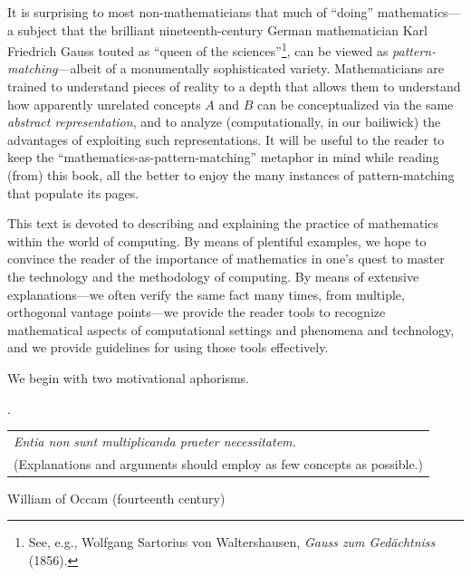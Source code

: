 It is surprising to most non-mathematicians that much of ``doing'' mathematics---a subject that the brilliant nineteenth-century German mathematician Karl Friedrich Gauss touted as ``queen of the sciences''\footnote{See, e.g., Wolfgang Sartorius von Waltershausen, {\it Gauss zum Ged\"{a}chtniss} (1856).}, can be viewed as {\em pattern-matching}---albeit of a monumentally sophisticated variety.  Mathematicians are trained to understand pieces of reality to a depth that allows them to understand how apparently unrelated concepts $A$ and $B$ can be conceptualized via the same {\em abstract representation}, and to analyze (computationally, in our bailiwick) the advantages of exploiting such representations.  It will be useful to the reader to keep the ``mathematics-as-pattern-matching'' metaphor in mind while reading (from) this book, all the better to enjoy the many instances of pattern-matching that populate its pages.

\medskip

This text is devoted to describing and explaining the practice of mathematics within the world of computing.  By means of plentiful examples, we hope to convince the reader of the importance of mathematics in one's quest to master the technology and the methodology of computing.  By means of extensive explanations---we often verify the same fact many times, from multiple,
orthogonal vantage points---we provide the reader tools to recognize mathematical aspects of computational settings and phenomena and technology, and we provide guidelines for using those tools effectively.

\medskip

We begin with two motivational aphorisms.

\medskip

.

\smallskip

\noindent \hspace*{.1in}
\begin{tabular}{l}
{\it Entia non sunt multiplicanda praeter necessitatem.} \\
(Explanations and arguments should employ as few concepts as possible.) \\
\end{tabular}

\hfill {\small William of Occam (fourteenth century)} 

